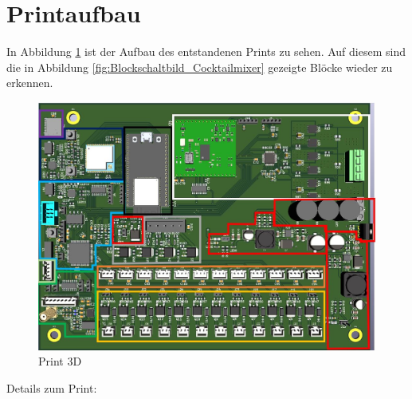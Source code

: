 \newpage
\section{Printaufbau}
\label{sec:Printaufbau}

In Abbildung \ref{fig:Print_3D} ist der Aufbau des entstandenen Prints zu sehen. Auf diesem sind die in Abbildung  \ref{fig:Blockschaltbild_Cocktailmixer} gezeigte Blöcke wieder zu erkennen. 

\begin{figure}[H]
	\centering
	\includegraphics[width=\textwidth]{graphics/Printteile}
	\caption{Print 3D}
	\label{fig:Print_3D}
\end{figure} 

Details zum Print:

